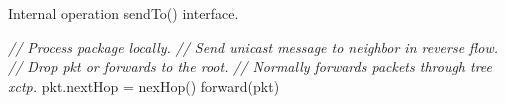 \begin{algorithm}[!t]
    \caption{Internal operation sendTo() interface.}
    \label{alg:1}
    \begin{algorithmic}[1]
        
                \STATE \textit{// Process package locally.}
                \STATE \textit{// Send unicast message to neighbor in reverse flow.}
            \ELSE
                \STATE \textit{// Drop pkt or forwards to the root.}
            \ENDIF
        \ELSE
            \STATE \textit{// Normally forwards packets through tree \ac{xctp}.}
            \STATE pkt.nextHop = nexHop()
            \STATE forward(pkt)
        \ENDIF
    \end{algorithmic}
\end{algorithm}

